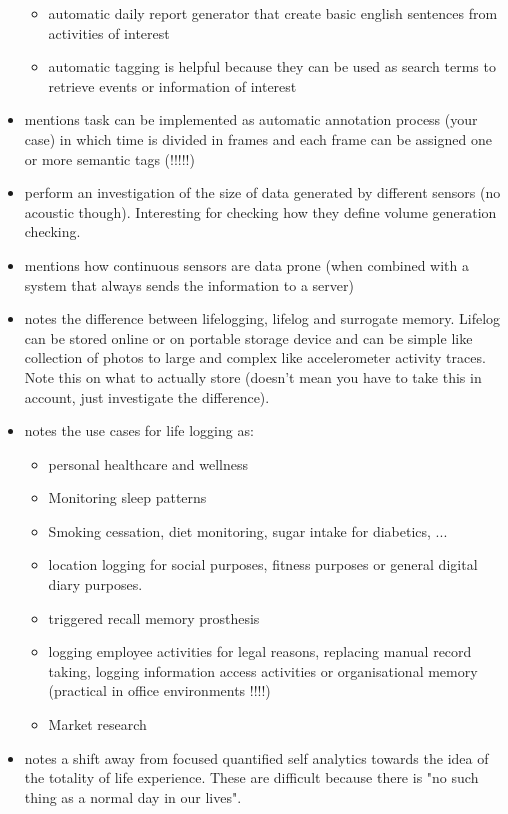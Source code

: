 \begin{itemize}
\begin{itemize}
		\item automatic daily report generator that create basic english sentences from activities of interest
		\item automatic tagging is helpful because they can be used as search terms to retrieve events or information of interest
	\end{itemize}
	\item \cite{bayindir2017survey} mentions task can be implemented as automatic annotation process (your case) in which time is divided in frames and each frame can be assigned one or more semantic tags (!!!!!)
	\item \cite{khan2019smartphone} perform an investigation of the size of data generated by different sensors (no acoustic though). Interesting for checking how they define volume generation checking.
	\item \cite{khan2019smartphone} mentions how continuous sensors are data prone (when combined with a system that always sends the information to a server)
	\item \cite{gurrin2014lifelogging} notes the difference between lifelogging, lifelog and surrogate memory. Lifelog can be stored online or on portable storage device and can be simple like collection of photos to large and complex like accelerometer activity traces. Note this on what to actually store (doesn't mean you have to take this in account, just investigate the difference).
	\item \cite{gurrin2014lifelogging} notes the use cases for life logging as:
	\begin{itemize}
		\item personal healthcare and wellness
		\item Monitoring sleep patterns
		\item Smoking cessation, diet monitoring, sugar intake for diabetics, ...
		\item location logging for social purposes, fitness purposes or general digital diary purposes.
		\item triggered recall memory prosthesis
		\item logging employee activities for legal reasons, replacing manual record taking, logging information access activities or organisational memory (practical in office environments !!!!)
		\item Market research
	\end{itemize}
	\item \cite{gurrin2014lifelogging} notes a shift away from focused quantified self analytics towards the idea of the totality of life experience. These are difficult because there is "no such thing as a normal day in our lives".

\end{itemize}
